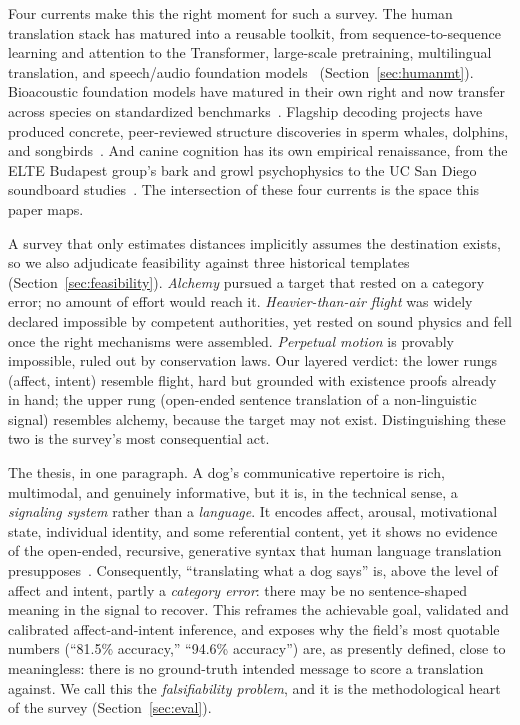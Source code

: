 Four currents make this the right moment for such a survey. The human
translation stack has matured into a reusable toolkit, from sequence-to-sequence
learning and attention to the Transformer, large-scale pretraining,
multilingual translation, and speech/audio foundation
models~\cite{sutskever2014seq2seq,cho2014rnn,bahdanau2015attention,vaswani2017attention,devlin2019bert,brown2020gpt3,costajussa2022nllb,nllb2024scaling,radford2023whisper,baevski2020wav2vec2,borsos2023audiolm}
(Section~\ref{sec:humanmt}). Bioacoustic foundation models have matured in
their own right and now transfer across species on standardized
benchmarks~\cite{hagiwara2023aves,robinson2024naturelm,ghani2023perch,hagiwara2023beans}.
Flagship decoding projects have produced concrete, peer-reviewed structure
discoveries in sperm whales, dolphins, and
songbirds~\cite{sharma2024whale,google2025dolphingemma,esp2026finch}. And
canine cognition has its own empirical renaissance, from the ELTE Budapest
group's bark and growl psychophysics to the UC San Diego soundboard
studies~\cite{pongracz2005barks,farago2017growls,bastos2024plos,bastos2024scirep}.
The intersection of these four currents is the space this paper maps.

A survey that only estimates distances implicitly assumes the destination
exists, so we also adjudicate feasibility against three historical
templates (Section~\ref{sec:feasibility}). \emph{Alchemy} pursued a target
that rested on a category error; no amount of effort would reach it.
\emph{Heavier-than-air flight} was widely declared impossible by competent
authorities, yet rested on sound physics and fell once the right mechanisms
were assembled. \emph{Perpetual motion} is provably impossible, ruled out by
conservation laws. Our layered verdict: the lower rungs (affect, intent)
resemble flight, hard but grounded with existence proofs already in hand;
the upper rung (open-ended sentence translation of a non-linguistic signal)
resembles alchemy, because the target may not exist. Distinguishing these
two is the survey's most consequential act.

The thesis, in one paragraph. A dog's communicative repertoire is rich,
multimodal, and genuinely informative, but it is, in the technical sense, a
\emph{signaling system} rather than a \emph{language}. It encodes affect,
arousal, motivational state, individual identity, and some referential
content, yet it shows no evidence of the open-ended, recursive, generative
syntax that human language translation
presupposes~\cite{hauser2002faculty,chomsky1957syntactic}. Consequently,
``translating what a dog says'' is, above the level of affect and intent,
partly a \emph{category error}: there may be no sentence-shaped meaning in
the signal to recover. This reframes the achievable goal, validated and
calibrated affect-and-intent inference, and exposes why the field's most
quotable numbers (``81.5\% accuracy,'' ``94.6\% accuracy'') are, as
presently defined, close to meaningless: there is no ground-truth intended
message to score a translation against. We call this the
\emph{falsifiability problem}, and it is the methodological heart of the
survey (Section~\ref{sec:eval}).

